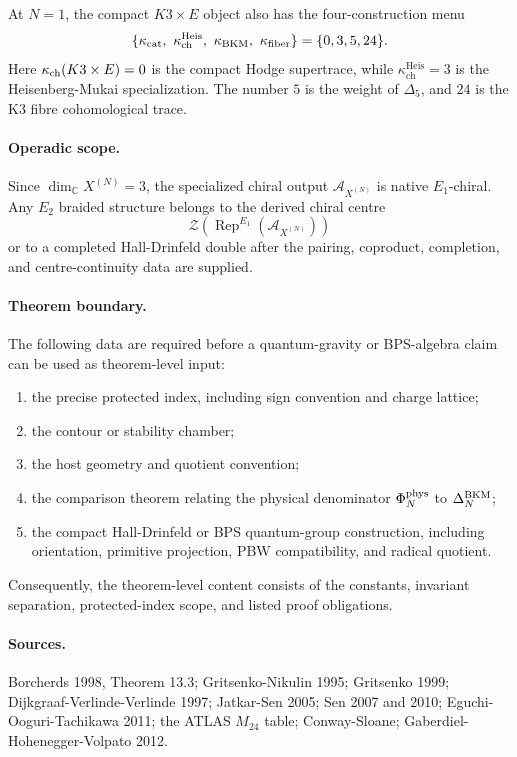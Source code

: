 At \(N=1\), the compact \(K3\times E\) object also has the
four-construction menu
\[
  \{\kcat,\ \kappa_{\mathrm{ch}}^{\mathrm{Heis}},\ \kBKM,\ \kfib\}
  =
  \{0,3,5,24\}.
\]
Here \(\kappa_{\mathrm{ch}}(K3\times E)=0\) is the compact Hodge supertrace, while
\(\kappa_{\mathrm{ch}}^{\mathrm{Heis}}=3\) is the Heisenberg-Mukai
specialization. The number \(5\) is the weight of \(\Delta_5\), and
\(24\) is the K3 fibre cohomological trace.

\paragraph{Operadic scope.}
Since \(\dim_{\mathbb C}X^{(N)}=3\), the specialized chiral output
\(\mathcal A_{X^{(N)}}\) is native \(E_1\)-chiral. Any \(E_2\) braided
structure belongs to the derived chiral centre
\[
  \mathcal Z(\operatorname{Rep}^{E_1}(\mathcal A_{X^{(N)}}))
\]
or to a completed Hall-Drinfeld double after the pairing, coproduct,
completion, and centre-continuity data are supplied.

\paragraph{Theorem boundary.}
The following data are required before a quantum-gravity or BPS-algebra
claim can be used as theorem-level input:
\begin{enumerate}
\item the precise protected index, including sign convention and charge
  lattice;
\item the contour or stability chamber;
\item the host geometry and quotient convention;
\item the comparison theorem relating the physical denominator
  \(\Phi^{\mathrm{phys}}_N\) to \(\Delta^{\mathrm{BKM}}_N\);
\item the compact Hall-Drinfeld or BPS quantum-group construction,
  including orientation, primitive projection, PBW compatibility, and
  radical quotient.
\end{enumerate}
Consequently, the theorem-level content consists of the constants,
invariant separation, protected-index scope, and listed proof
obligations.

\paragraph{Sources.}
Borcherds 1998, Theorem 13.3; Gritsenko-Nikulin 1995; Gritsenko 1999;
Dijkgraaf-Verlinde-Verlinde 1997; Jatkar-Sen 2005; Sen 2007 and 2010;
Eguchi-Ooguri-Tachikawa 2011; the ATLAS \(M_{24}\) table;
Conway-Sloane; Gaberdiel-Hohenegger-Volpato 2012.

